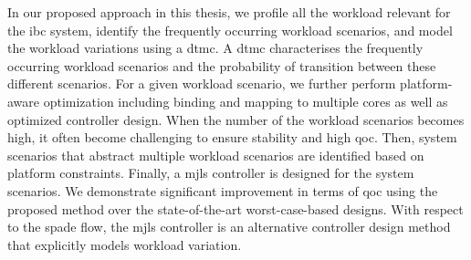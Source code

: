 In our proposed approach in this thesis, we profile all the workload relevant for the \gls{ibc} system, identify the frequently occurring workload scenarios, and model the workload variations using a \gls{dtmc}. A \gls{dtmc} characterises the frequently occurring workload scenarios and the probability of transition between these different scenarios. For a given workload scenario, we further perform platform-aware optimization including binding and mapping to multiple cores as well as optimized controller design. 
When the number of the workload scenarios becomes high, it often become challenging to ensure stability and high \gls{qoc}.
Then, system scenarios that abstract multiple workload scenarios are identified based on platform constraints. 
Finally, a \gls{mjls} controller is designed for the system scenarios.
We demonstrate significant improvement in terms of \gls{qoc} using the proposed method over the state-of-the-art worst-case-based designs. With respect to the \gls{spade} flow, the \gls{mjls} controller is an alternative controller design method that explicitly models workload variation. 

